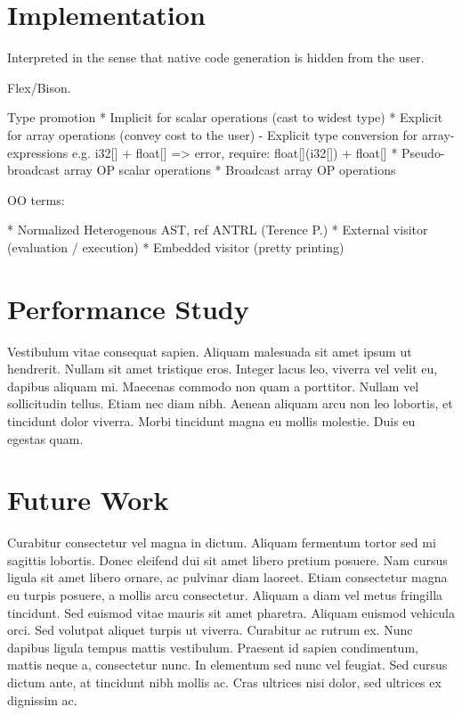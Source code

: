 \documentclass{sigplanconf}
\begin{document}
\section{Implementation}

Interpreted in the sense that native code generation is hidden from the user.

Flex/Bison.

Type promotion
 * Implicit for scalar operations (cast to widest type)
 * Explicit for array operations (convey cost to the user)
   - Explicit type conversion for array-expressions
     e.g. i32[] + float[] => error, require: float[](i32[]) + float[]
 * Pseudo-broadcast array OP scalar operations
 * Broadcast array OP operations
     
OO terms:

 * Normalized Heterogenous AST, ref ANTRL (Terence P.)
 * External visitor (evaluation / execution)
 * Embedded visitor (pretty printing)

\section{Performance Study}

Vestibulum vitae consequat sapien. Aliquam malesuada sit amet ipsum ut hendrerit. Nullam sit amet tristique eros. Integer lacus leo, viverra vel velit eu, dapibus aliquam mi. Maecenas commodo non quam a porttitor. Nullam vel sollicitudin tellus. Etiam nec diam nibh. Aenean aliquam arcu non leo lobortis, et tincidunt dolor viverra. Morbi tincidunt magna eu mollis molestie. Duis eu egestas quam.

\section{Future Work}

Curabitur consectetur vel magna in dictum. Aliquam fermentum tortor sed mi sagittis lobortis. Donec eleifend dui sit amet libero pretium posuere. Nam cursus ligula sit amet libero ornare, ac pulvinar diam laoreet. Etiam consectetur magna eu turpis posuere, a mollis arcu consectetur. Aliquam a diam vel metus fringilla tincidunt. Sed euismod vitae mauris sit amet pharetra. Aliquam euismod vehicula orci. Sed volutpat aliquet turpis ut viverra. Curabitur ac rutrum ex. Nunc dapibus ligula tempus mattis vestibulum. Praesent id sapien condimentum, mattis neque a, consectetur nunc. In elementum sed nunc vel feugiat. Sed cursus dictum ante, at tincidunt nibh mollis ac. Cras ultrices nisi dolor, sed ultrices ex dignissim ac.
\end{document}
